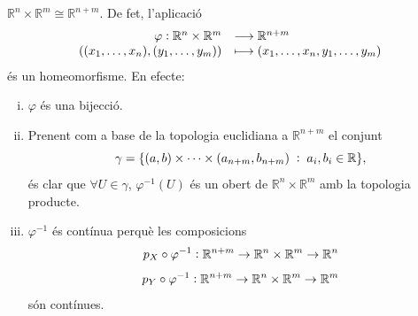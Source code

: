 \documentclass[../main.tex]{subfiles}
\begin{document}
\begin{ej}
$\mathbb{R}^n\times\mathbb{R}^m\cong\mathbb{R}^{n+m}$. De fet, l'aplicació
\begin{equation}
    \notag
    \begin{array}{rl}
        \varphi:\mathbb{R}^n\times\mathbb{R}^m & \longrightarrow \mathbb{R}^{n+m} \\
        ((x_1,\ldots,x_n),(y_1,\ldots,y_m)) & \longmapsto (x_1,\ldots,x_n,y_1,\ldots,y_m)
    \end{array}
\end{equation}
és un homeomorfisme. En efecte:
\begin{enumerate}[(i)]
    \item $\varphi$ és una bijecció.
    \item Prenent com a base de la topologia euclidiana a $\mathbb{R}^{n+m}$ el conjunt
    \begin{equation}
        \notag
        \gamma = \{(a,b)\times\cdots\times(a_{n+m},b_{n+m})\;:\;a_i,b_i\in\mathbb{R}\},
    \end{equation}
    és clar que $\forall U\in\gamma$, $\varphi^{-1}(U)$ és un obert de $\mathbb{R}^n\times\mathbb{R}^m$ amb la topologia producte.
    
    \item $\varphi^{-1}$ és contínua perquè les composicions
    \begin{equation}
        \notag
        p_X\circ \varphi^{-1}:\mathbb{R}^{n+m}\rightarrow\mathbb{R}^n\times\mathbb{R}^m\rightarrow\mathbb{R}^n 
    \end{equation}
    \begin{equation}
        \notag
        p_Y\circ\varphi^{-1}:\mathbb{R}^{n+m}\rightarrow\mathbb{R}^n\times\mathbb{R}^m\rightarrow\mathbb{R}^m
    \end{equation}
    són contínues.
\end{enumerate}
\end{ej}
\end{document}
